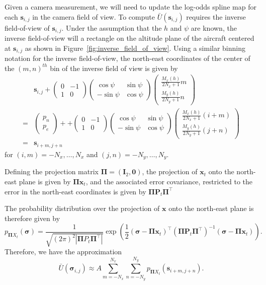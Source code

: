 \documentclass{article}
\newcommand{\sbf}{\mathbf{s}}
\newcommand{\xbf}{\mathbf{x}}
\newcommand{\Ibf}{\mathbf{I}}
\newcommand{\Pbf}{\mathbf{P}}
\newcommand{\sigmabf}{\boldsymbol{\sigma}}
\newcommand{\Pibf}{\boldsymbol{\Pi}}
\begin{document}
Given a camera measurement, we will need to update the log-odds spline map for each $\sbf_{i,j}$ in the camera field of view. To compute $\bar{U}(\sbf_{i,j})$ requires the inverse field-of-view of $\sbf_{i,j}$.  Under the assumption that the $h$ and $\psi$ are known, the inverse field-of-view will a rectangle on the altitude plane of the aircraft centered at $\sbf_{i,j}$ as shown in Figure~\ref{fig:inverse_field_of_view}.  Using a similar binning notation for the inverse field-of-view, the north-east coordinates of the center of the $(m,n)^{th}$ bin of the inverse field of view is given by
\begin{align*}
&\sbf_{i,j} + \begin{pmatrix} 0 & -1 \\ 1 & 0 \end{pmatrix} \begin{pmatrix}\cos\psi & \sin\psi \\ -\sin\psi & \cos\psi \end{pmatrix}\begin{pmatrix} \frac{M_x(h)}{2N_x+1} m \\ \frac{M_y(h)}{2N_y+1} n \end{pmatrix} \\
=& \begin{pmatrix} p_n \\ p_e \end{pmatrix} + + \begin{pmatrix} 0 & -1 \\ 1 & 0 \end{pmatrix} \begin{pmatrix}\cos\psi & \sin\psi \\ -\sin\psi & \cos\psi \end{pmatrix}\begin{pmatrix} \frac{M_x(h)}{2N_x+1} (i+m) \\ \frac{M_y(h)}{2N_y+1} (j+n) \end{pmatrix} \\
=& \sbf_{i+m, j+n}
\end{align*}
for $(i,m)=-N_x, \dots, N_x$ and $(j,n)=-N_y, \dots, N_y$.

Defining the projection matrix $\Pibf = (\Ibf_2, \mathbf{0})$, the projection of $\xbf_t$ onto the north-east plane is given by $\Pibf\xbf_t$, and the associated error covariance, restricted to the error in the north-east coordinates is given by $\Pibf \Pbf_t \Pibf^\top$

 The probability distribution over the projection of $\xbf$ onto the north-east plane is therefore given by
\[
p_{\Pibf X_t}(\sigmabf) = \frac{1}{\sqrt{(2\pi)^2|\Pibf P_t \Pibf^\top|}}\exp\left(\frac{1}{2}(\sigmabf-\Pibf\xbf_t)^\top (\Pibf \Pbf_t\Pibf^\top)^{-1}(\sigmabf-\Pibf\xbf_t)\right).
\]
Therefore, we have the approximation
\begin{equation}\label{eq:approximation_of_Ubar}
\bar{U}(\sigmabf_{i,j}) \approx A \sum_{m=-N_x}^{N_x} \sum_{n=-N_y}^{N_y} p_{\Pibf X_t}(\sbf_{i+m,j+n}).
\end{equation}
\end{document}
